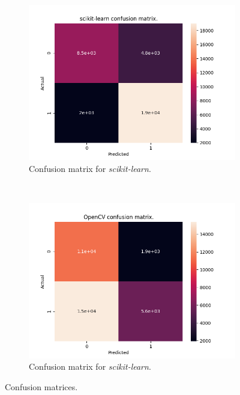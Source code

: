 \begin{figure}[h!t]
    \centering
    \begin{subfigure}{.4\textwidth}
        \includegraphics[scale=0.29]{images/confusion_skl.png}
        \caption{Confusion matrix for \textit{scikit-learn}.}
        \label{fig:confusion_skl}
    \end{subfigure}
    ~
    \begin{subfigure}{.4\textwidth}
        \includegraphics[scale=0.29]{images/confusion_cv2.png}
        \caption{Confusion matrix for \textit{scikit-learn}.}
        \label{fig:confusion_cv2}
    \end{subfigure}
    \caption{Confusion matrices.}
    \label{fig:confusion}
\end{figure}

